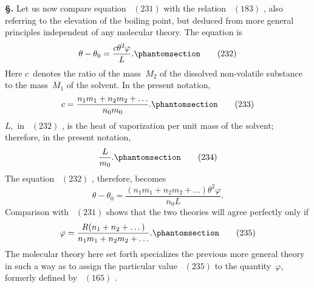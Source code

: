 \documentclass[12pt]{book}[2005/09/16]
\newcommand{\Chg}[2]{#2}
\newcommand{\Add}[1]{\Chg{}{#1}}
\newcommand{\Section}[1]{
  \medskip\par\textbf{§\;#1}
  \label{section:#1}
}
\newcommand{\Tag}[1]{%
  \phantomsection\label{eqn:#1}\tag*{\ensuremath{#1}}%
}
\newcommand{\Eq}[1]{%
  \hyperref[eqn:#1]{\ensuremath{#1}}%
}
\newcommand{\PageSep}[1]{\ignorespaces}
\begin{document}
\Section{269.} Let us now compare equation~\Eq{(231)} with the
relation~\Eq{(183)}, also referring to the elevation of the boiling
point, but deduced from more general principles independent
of any molecular theory. The equation is
\[
\theta - \theta_{0} = \frac{c \theta^{2} \varphi}{L}\Add{.}
\Tag{(232)}
\]
Here $c$~denotes the ratio of the mass~$M_{2}$ of the dissolved
non-volatile substance to the mass~$M_{1}$ of the solvent. In
the present notation,
\[
c = \frac{n_{1} m_{1} + n_{2} m_{2} + \dots}{n_{0} m_{0}}.
\Tag{(233)}
\]
$L$,~in~\Eq{(232)}, is the heat of vaporization per unit mass of the
solvent; therefore, in the present notation,
\[
\frac{L}{m_{0}}\Add{.}
\Tag{(234)}
\]
The equation~\Eq{(232)}, therefore, becomes
\[
\theta - \theta_{0} = \frac{(n_{1} m_{1} + n_{2} m_{2} + \dots) \theta^{2} \varphi}{n_{0} L}.
\]
\PageSep{249}
Comparison with~\Eq{(231)} shows that the two theories will
agree perfectly only if
\[
\varphi = \frac{R(n_{1} + n_{2} + \dots)}{n_{1} m_{1} + n_{2} m_{2} + \dots}.
\Tag{(235)}
\]
The molecular theory here set forth specializes the previous
more general theory in such a way as to assign the particular
value~\Eq{(235)} to the quantity~$\varphi$, formerly defined by~\Eq{(165)}.
\end{document}
